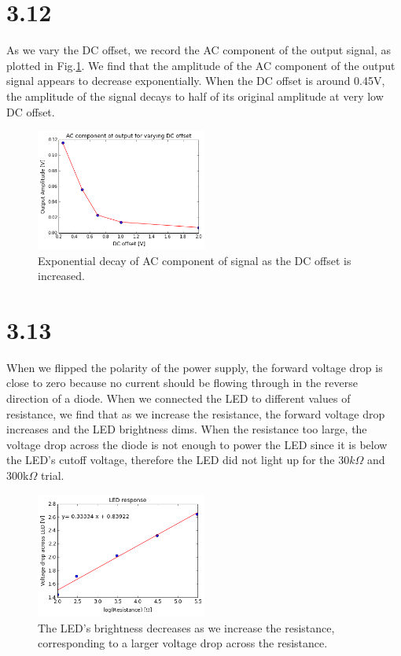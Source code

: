 \documentclass[authoryear, 12pt,5p, times]{elsarticle}
\begin{document}
\section*{3.12}
As we vary the DC offset, we record the AC component of the output signal, as plotted in Fig.\ref{3_12}. We find that the amplitude of the AC component of the output signal appears to decrease exponentially. When the DC offset is around 0.45V, the amplitude of the signal decays to half of its original amplitude at very low DC offset. 
\begin{figure}[h!]
\center
\includegraphics[width=0.5\textwidth]{figure/3_12_fig}
\caption{Exponential decay of AC component of signal as the DC offset is increased.}
\label{3_12}
\end{figure}

\section*{3.13}
When we flipped the polarity of the power supply, the forward voltage drop is close to zero because no current should be flowing through in the reverse direction of a diode. When we connected the LED to different values of resistance, we find that as we increase the resistance, the forward voltage drop increases and the LED brightness dims. When the resistance too large, the voltage drop across the diode is not enough to power the LED since it is below the LED's cutoff voltage, therefore the LED did not light up for the $30k\Omega$ and 300k$\Omega$ trial.
\begin{figure}[h!]
\center
\includegraphics[width=0.5\textwidth]{figure/3_13_LED}
\caption{The LED's brightness decreases as we increase the resistance, corresponding to a larger voltage drop across the resistance.}
\label{3_13_LED}
\end{figure}
\vspace{-20pt}
\end{document}
